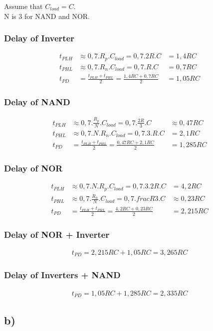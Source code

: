 \documentclass[a4paper,10pt]{article}
\begin{document}
Assume that $C_{load}=C$.\\

N is 3 for NAND and NOR.


\subsubsection*{Delay of Inverter}
\begin{align*}
t_{PLH}&\approx 0,7.R_p. C_{load} = 0,7.2R.C &= 1,4RC\\
t_{PHL}&\approx 0,7.R_n. C_{load} = 0,7.R.C &= 0,7RC\\
t_{PD} &= \frac{t_{PLH}+t_{PHL}}{2} = \frac{1,4RC+0,7RC}{2} &= 1,05RC
\end{align*}
\subsubsection*{Delay of NAND}
\begin{align*}
t_{PLH}&\approx 0,7.\frac{R_p}{N}. C_{load} = 0,7.\frac{2R}{3}.C &\approx 0,47RC \\
t_{PHL}&\approx 0,7.N.R_n. C_{load} = 0,7.3.R.C &= 2,1RC\\
t_{PD} &= \frac{t_{PLH}+t_{PHL}}{2} = \frac{0,47RC+2,1RC}{2} &= 1,285RC
\end{align*}
\subsubsection*{Delay of NOR}
\begin{align*}
 t_{PLH}&\approx 0,7.N.R_p. C_{load} = 0,7.3.2R.C &= 4,2RC\\
 t_{PHL}&\approx 0,7.\frac{R_n}{N}. C_{load} = 0,7.frac{R}{3}.C &\approx 0,23RC\\
 t_{PD} &= \frac{t_{PLH}+t_{PHL}}{2} = \frac{4,2RC+0,23RC}{2} &= 2,215RC
\end{align*}

\subsubsection*{Delay of NOR + Inverter}
\begin{align*}
t_{PD}= 2,215RC + 1,05RC = 3,265RC
\end{align*}
\subsubsection*{Delay of Inverters + NAND}
\begin{align*}
t_{PD}= 1,05RC + 1,285RC = 2,335RC
\end{align*}

\subsection*{b)}
\end{document}
